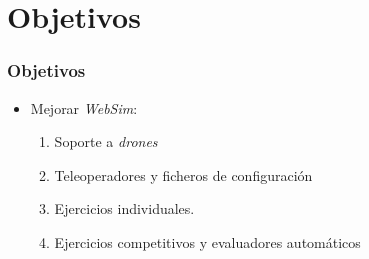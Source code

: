 \documentclass[xcolor={table}]{beamer}
\begin{document}
\begin{frame}
\begin{itemize}
		\end{itemize}
	\end{frame}

	\section{Objetivos}
		\begin{frame}
			\frametitle{Objetivos}
			\begin{itemize}\itemsep4pt
			    \item Mejorar \textit{WebSim}:
			    \begin{enumerate}\itemsep5pt
			        	\item Soporte a \textit{drones}
				\item Teleoperadores y ficheros de configuración
				\item Ejercicios individuales. 
				\item Ejercicios competitivos y evaluadores automáticos 
			    \end{enumerate}{}
			
			\end{itemize}
		\end{frame}
\end{document}
